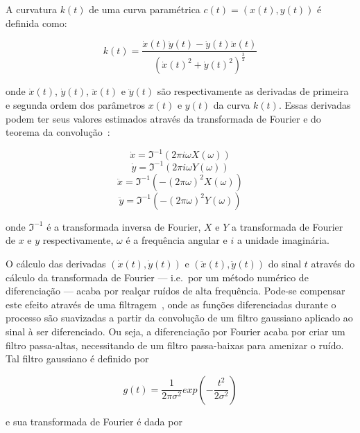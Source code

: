 A curvatura $k(t)$ de uma curva paramétrica $c(t) = (x(t), y(t))$ é definida como:

\begin{equation}
k(t) = \frac{\dot{x}(t)\ddot{y}(t)-\dot{y}(t)\ddot{x}(t)} {(\dot{x}(t)^2+\dot{y}(t)^2)^\frac{3}{2}}
\label{eq:curvatura}
\end{equation}

\noindent onde $\dot{x}(t)$, $\dot{y}(t)$, $\ddot{x}(t)$ e
$\ddot{y}(t)$ são respectivamente as derivadas de primeira e segunda
ordem dos parâmetros $x(t)$ e $y(t)$ da curva $k(t)$. Essas derivadas
podem ter seus valores estimados através da transformada de Fourier e
do teorema da convolução~\cite{papoulis}:

\begin{equation}
\dot{x} = \Im^{-1}(2\pi i \omega X(\omega))
\end{equation}
\begin{equation}
\dot{y} = \Im^{-1}(2\pi i \omega Y(\omega))
\end{equation}
\begin{equation}
\ddot{x} = \Im^{-1}(-(2\pi\omega)^2 X(\omega))
\end{equation}
\begin{equation}
\ddot{y} = \Im^{-1}(-(2\pi\omega)^2 Y(\omega))
\end{equation}

\noindent onde $\Im^{-1}$ é a transformada inversa de Fourier, $X$ e $Y$ a
transformada de Fourier de $x$ e $y$ respectivamente, $\omega$ é a frequência angular
e $i$ a unidade imaginária.

O cálculo das derivadas $(\dot{x}(t), \dot{y}(t))$ e $(\ddot{x}(t),
\ddot{y}(t))$ do sinal $t$ através do cálculo da transformada de
Fourier --- i.e.\ por um método numérico de diferenciação --- acaba
por realçar ruídos de alta frequência. Pode-se compensar este efeito
através de uma filtragem~\cite{luciano,luciano2010}, onde as funções
diferenciadas durante o processo são suavizadas a partir da convolução
de um filtro gaussiano aplicado ao sinal à ser diferenciado. Ou seja,
a diferenciação por Fourier acaba por criar um filtro passa-altas,
necessitando de um filtro passa-baixas para amenizar o ruído. Tal
filtro gaussiano é definido por

\begin{equation}
g(t) = \frac{1}{2\pi\sigma^2} exp \left( -\frac{t^2}{2\sigma^2}\right)
\end{equation}

\noindent e sua transformada de Fourier é dada por

